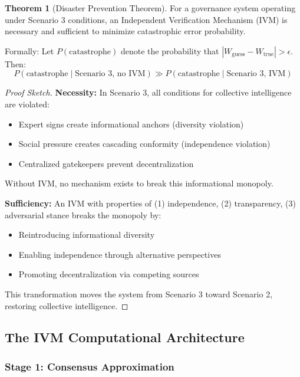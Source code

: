 \documentclass[11pt,a4paper]{article}
\theoremstyle{definition}
\newtheorem{theorem}{Theorem}[section]
\theoremstyle{remark}
\begin{document}
\begin{theorem}[Disaster Prevention Theorem]
For a governance system operating under Scenario 3 conditions, an Independent Verification Mechanism (IVM) is necessary and sufficient to minimize catastrophic error probability.

Formally: Let $P(\text{catastrophe})$ denote the probability that $|W_{\text{guess}} - W_{\text{true}}| > \epsilon$. Then:
\begin{equation}
P(\text{catastrophe} \mid \text{Scenario 3, no IVM}) \gg P(\text{catastrophe} \mid \text{Scenario 3, IVM})
\end{equation}
\end{theorem}

\begin{proof}[Proof Sketch]
\textbf{Necessity:} In Scenario 3, all conditions for collective intelligence are violated:
\begin{itemize}
\item Expert signs create informational anchors (diversity violation)
\item Social pressure creates cascading conformity (independence violation)  
\item Centralized gatekeepers prevent decentralization
\end{itemize}

Without IVM, no mechanism exists to break this informational monopoly.

\textbf{Sufficiency:} An IVM with properties of (1) independence, (2) transparency, (3) adversarial stance breaks the monopoly by:
\begin{itemize}
\item Reintroducing informational diversity
\item Enabling independence through alternative perspectives
\item Promoting decentralization via competing sources
\end{itemize}

This transformation moves the system from Scenario 3 toward Scenario 2, restoring collective intelligence.
\end{proof}

\subsection{The IVM Computational Architecture}

\subsubsection{Stage 1: Consensus Approximation}
\end{document}
